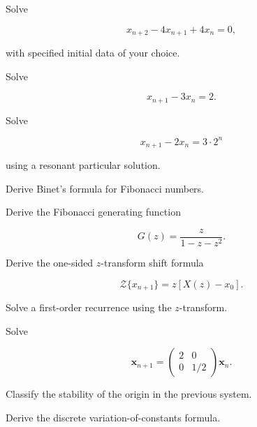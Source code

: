 \begin{exercise}[3]
Solve

\[
x_{n+2}
-
4x_{n+1}
+
4x_n
=
0,
\]

with specified initial data of your choice.
\end{exercise}

\begin{exercise}[3]
Solve

\[
x_{n+1}
-
3x_n
=
2.
\]
\end{exercise}

\begin{exercise}[3]
Solve

\[
x_{n+1}
-
2x_n
=
3\cdot2^n
\]

using a resonant particular solution.
\end{exercise}

\begin{exercise}[3]
Derive Binet's formula for Fibonacci numbers.
\end{exercise}

\begin{exercise}[3]
Derive the Fibonacci generating function

\[
G(z)
=
\frac{z}{1-z-z^2}.
\]
\end{exercise}

\begin{exercise}[3]
Derive the one-sided \(z\)-transform shift formula

\[
\mathcal{Z}\{x_{n+1}\}
=
z[X(z)-x_0].
\]
\end{exercise}

\begin{exercise}[3]
Solve a first-order recurrence using the \(z\)-transform.
\end{exercise}

\begin{exercise}[3]
Solve

\[
\mathbf{x}_{n+1}
=
\begin{pmatrix}
2&0\\
0&1/2
\end{pmatrix}
\mathbf{x}_n.
\]
\end{exercise}

\begin{exercise}[3]
Classify the stability of the origin in the previous system.
\end{exercise}

\begin{exercise}[3]
Derive the discrete variation-of-constants formula.
\end{exercise}

